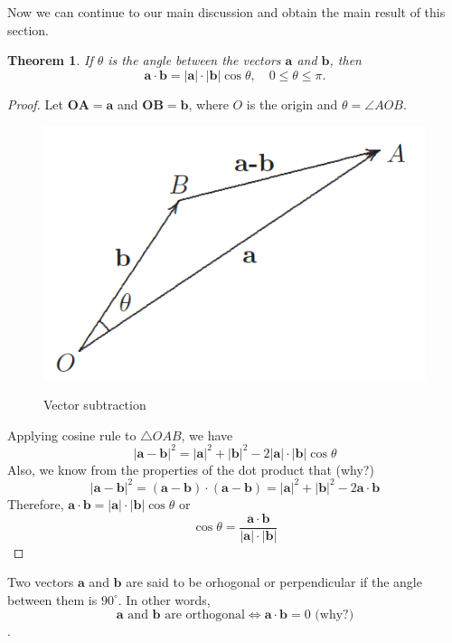 \documentclass[12pt]{article}
\newtheorem{thm}{Theorem}[section]
\begin{document}
Now we can continue to our main discussion and obtain the main result of this section.

\begin{thm}
  If $\theta$ is the angle between the vectors $\pmb{a}$ and $\pmb{b}$, then
  $$ \pmb{a} \cdot \pmb{b} = |\pmb{a}| \cdot |\pmb{b}| \cos \theta, \quad 0 \leq \theta \leq \pi.$$
\end{thm}

\begin{proof}
  Let $\pmb{OA}=\pmb{a}$ and $\pmb{OB}=\pmb{b}$, where $O$ is the origin and $\theta = \angle AOB$.
  
  \begin{center}
    \begin{figure}[h]
      \centering
      \includegraphics[width=\linewidth/3]{figures/fig5.png}
      \label{fig:5}
      \caption{Vector subtraction}
    \end{figure}
  \end{center}

  Applying cosine rule to $\triangle OAB$, we have
  $$ |\pmb{a} - \pmb{b}|^2 = |\pmb{a}|^2 + |\pmb{b}|^2 - 2 |\pmb{a}| \cdot |\pmb{b}| \cos \theta $$
  Also, we know from the properties of the dot product that (why?)
  $$ |\pmb{a} - \pmb{b}|^2 = (\pmb{a} - \pmb{b}) \cdot (\pmb{a} - \pmb{b}) = |\pmb{a}|^2 + |\pmb{b}|^2 - 2 \pmb{a} \cdot \pmb{b}$$
  Therefore, $ \pmb{a} \cdot \pmb{b} = |\pmb{a}| \cdot |\pmb{b}| \cos \theta $ or
  $$ \cos \theta = \frac{\pmb{a} \cdot \pmb{b}}{ |\pmb{a}| \cdot |\pmb{b}|} $$
\end{proof}

Two vectors $\pmb{a}$ and $\pmb{b}$ are said to be orhogonal or perpendicular if the angle between them is $90^\circ$.
In other words,
$$ \pmb{a} \text{ and } \pmb{b} \text{ are orthogonal} \iff \pmb{a} \cdot \pmb{b} = 0 \text{ (why?)}$$.
\end{document}
